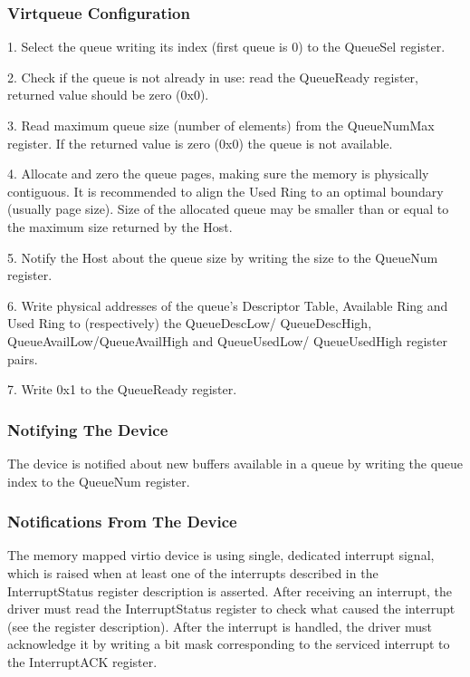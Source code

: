 \subsubsection{Virtqueue Configuration}\label{sec:Virtio Transport Options / Virtio Over MMIO / MMIO-specific Initialization And Device Operation / Virtqueue Configuration}

1. Select the queue writing its index (first queue is 0) to the
   QueueSel register.

2. Check if the queue is not already in use: read the QueueReady
   register, returned value should be zero (0x0).

3. Read maximum queue size (number of elements) from the
   QueueNumMax register. If the returned value is zero (0x0) the
   queue is not available.

4. Allocate and zero the queue pages, making sure the memory
   is physically contiguous. It is recommended to align the
   Used Ring to an optimal boundary (usually page size).
   Size of the allocated queue may be smaller than or equal to
   the maximum size returned by the Host.

5. Notify the Host about the queue size by writing the size to
   the QueueNum register.

6. Write physical addresses of the queue's Descriptor Table,
   Available Ring and Used Ring to (respectively) the QueueDescLow/
   QueueDescHigh, QueueAvailLow/QueueAvailHigh and QueueUsedLow/
   QueueUsedHigh register pairs.

7. Write 0x1 to the QueueReady register.

\subsubsection{Notifying The Device}\label{sec:Virtio Transport Options / Virtio Over MMIO / MMIO-specific Initialization And Device Operation / Notifying The Device}

The device is notified about new buffers available in a queue by
writing the queue index to the QueueNum register.

\subsubsection{Notifications From The Device}\label{sec:Virtio Transport Options / Virtio Over MMIO / MMIO-specific Initialization And Device Operation / Notifications From The Device}

The memory mapped virtio device is using single, dedicated
interrupt signal, which is raised when at least one of the
interrupts described in the InterruptStatus register
description is asserted. After receiving an interrupt, the
driver must read the InterruptStatus register to check what
caused the interrupt (see the register description). After the
interrupt is handled, the driver must acknowledge it by writing
a bit mask corresponding to the serviced interrupt to the
InterruptACK register.

